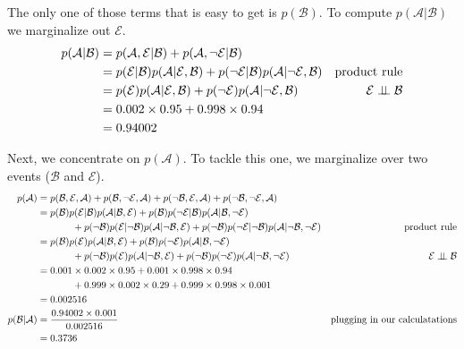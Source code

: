 \documentclass[assignment02_Solutions]{subfiles}
\begin{document}
\begin{exercise}[(60 minutes)]
\begin{boxedsolution}
The only one of those terms that is easy to get is $p(\mathcal{B})$.  To compute $p(\mathcal{A} | \mathcal{B})$ we marginalize out $\mathcal{E}$.
\begin{align}
p(\mathcal{A} | \mathcal{B}) &= p(\mathcal{A}, \mathcal{E} | \mathcal{B}) + p(\mathcal{A}, \neg \mathcal{E} | \mathcal{B}) \nonumber \\
&= p(\mathcal{E} | \mathcal{B}) p(\mathcal{A} | \mathcal{E}, \mathcal{B}) + p(\neg \mathcal{E} | \mathcal{B}) p(\mathcal{A} | \neg \mathcal{E}, \mathcal{B}) & \mbox{product rule} \nonumber \\
&=  p(\mathcal{E}) p(\mathcal{A} | \mathcal{E}, \mathcal{B}) + p(\neg \mathcal{E}) p(\mathcal{A} | \neg \mathcal{E}, \mathcal{B})  &  \mathcal{E} \perp\!\!\!\perp \mathcal{B} \nonumber \\
&= 0.002 \times 0.95 + 0.998 \times 0.94 \nonumber \\
&= 0.94002 \nonumber
\end{align}

Next, we concentrate on $p(\mathcal{A})$.  To tackle this one, we marginalize over two events ($\mathcal{B}$ and $\mathcal{E}$).
\begin{align}
p(\mathcal{A}) &= p(\mathcal{B}, \mathcal{E}, \mathcal{A}) +  p(\mathcal{B}, \neg \mathcal{E}, \mathcal{A}) + p(\neg \mathcal{B}, \mathcal{E}, \mathcal{A}) + p(\neg \mathcal{B}, \neg \mathcal{E}, \mathcal{A}) \nonumber \\
&= p(\mathcal{B}) p(\mathcal{E} | \mathcal{B}) p(\mathcal{A} | \mathcal{B}, \mathcal{E}) +   p(\mathcal{B}) p(\neg \mathcal{E} | \mathcal{B}) p(\mathcal{A} | \mathcal{B}, \neg \mathcal{E}) \nonumber \\
 &\hspace{0.5in} + p(\neg \mathcal{B}) p(\mathcal{E} | \neg \mathcal{B}) p(\mathcal{A} | \neg \mathcal{B}, \mathcal{E}) +  p(\neg \mathcal{B}) p(\neg \mathcal{E} | \neg \mathcal{B}) p(\mathcal{A} | \neg \mathcal{B}, \neg \mathcal{E}) &\mbox{product rule} \nonumber \\
 &= p(\mathcal{B}) p(\mathcal{E}) p(\mathcal{A} | \mathcal{B}, \mathcal{E}) +   p(\mathcal{B}) p(\neg \mathcal{E}) p(\mathcal{A} | \mathcal{B}, \neg \mathcal{E})  \nonumber \\
 &\hspace{0.5in} + p(\neg \mathcal{B}) p(\mathcal{E}) p(\mathcal{A} | \neg \mathcal{B}, \mathcal{E}) +  p(\neg \mathcal{B}) p(\neg \mathcal{E}) p(\mathcal{A} | \neg \mathcal{B}, \neg \mathcal{E})  & \mathcal{E} \perp\!\!\!\perp \mathcal{B}  \nonumber \\
 &= 0.001 \times 0.002 \times 0.95 + 0.001 \times 0.998 \times 0.94 \nonumber \\
 &\hspace{0.5in} + 0.999 \times 0.002 \times 0.29 + 0.999 \times 0.998 \times 0.001 \nonumber \\
 &= 0.002516 \nonumber \\
p(\mathcal{B} | \mathcal{A}) &= \frac{0.94002 \times 0.001}{0.002516} & \mbox{plugging in our calculatations} \nonumber \\
&= 0.3736 \nonumber
\end{align}
\end{boxedsolution}


\end{exercise}
\end{document}
